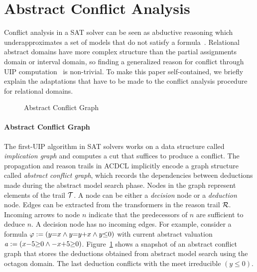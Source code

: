 \section{Abstract Conflict Analysis}\label{sec:conflict}

Conflict analysis in a SAT solver can be seen as abductive 
reasoning which underapproximates a set of models that do not satisfy a 
formula~\cite{sas12,dhk2013-popl}.  
Relational abstract domains have more complex structure than the partial 
assignments domain or interval domain, so finding a generalized reason for 
conflict through UIP computation~\cite{uip} is non-trivial.  To make this paper self-contained, 
we briefly explain the adaptations that have to be made to the conflict analysis procedure for relational domains. %
\begin{figure}[t]
\vspace*{-10ex} %
\caption{\label{conflict} Abstract Conflict Graph}
\end{figure}  

\paragraph {\textbf{Abstract Conflict Graph}}
The first-UIP algorithm in SAT solvers works on a data structure
called {\em implication graph} and computes a cut that suffices to
produce a conflict.  The propagation and reason trails in ACDCL
implicitly encode a graph structure called {\em abstract conflict
  graph}, which records the dependencies between deductions made
during the abstract model search phase.  Nodes in the graph represent
elements of the trail $\mathcal{T}$.  A node can be either a {\em decision}
node or a {\em deduction} node. Edges can be extracted from the
transformers in the reason trail $\mathcal{R}$.  Incoming arrows to node
$n$ indicate that the predecessors of $n$ are sufficient to deduce
$n$.  A decision node has no incoming edges.  For example, consider a
formula $\varphi:= (y{=}x \wedge y{=}y{+}x \wedge y {\leq} 0)$ with
current abstract valuation $\mathit{a}:= (x{-}5 {\geq} 0 \wedge {-}x{+}5 {\geq}
0)$.  Figure~\ref{conflict} shows a snapshot of an abstract conflict
graph that stores the deductions obtained from abstract model search
using the octagon domain.  The last deduction conflicts with the
meet irreducible $(y \leq 0)$.

